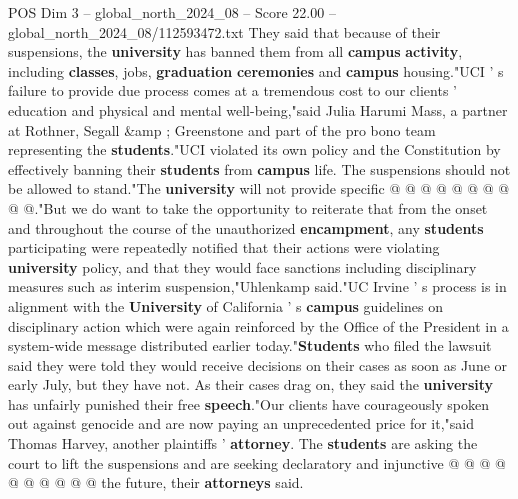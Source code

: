 \begin{textsample}{POS Dim 3 – global\_north\_2024\_08 – Score 22.00 – global\_north\_2024\_08/112593472.txt}
They said that because of their suspensions, the \textbf{university} has banned them from all \textbf{campus} \textbf{activity}, including \textbf{classes}, jobs, \textbf{graduation} \textbf{ceremonies} and \textbf{campus} housing."UCI ' s failure to provide due process comes at a tremendous cost to our clients ' education and physical and mental well-being,"said Julia Harumi Mass, a partner at Rothner, Segall \&amp ; Greenstone and part of the pro bono team representing the \textbf{students}."UCI violated its own policy and the Constitution by effectively banning their \textbf{students} from \textbf{campus} life.
The suspensions should not be allowed to stand."The \textbf{university} will not provide specific @ @ @ @ @ @ @ @ @ @."But we do want to take the opportunity to reiterate that from the onset and throughout the course of the unauthorized \textbf{encampment}, any \textbf{students} participating were repeatedly notified that their actions were violating \textbf{university} policy, and that they would face sanctions including disciplinary measures such as interim suspension,"Uhlenkamp said."UC Irvine ' s process is in alignment with the \textbf{University} of California ' s \textbf{campus} guidelines on disciplinary action which were again reinforced by the Office of the President in a system-wide message distributed earlier today."\textbf{Students} who filed the lawsuit said they were told they would receive decisions on their cases as soon as June or early July, but they have not.
As their cases drag on, they said the \textbf{university} has unfairly punished their free \textbf{speech}."Our clients have courageously spoken out against genocide and are now paying an unprecedented price for it,"said Thomas Harvey, another plaintiffs ' \textbf{attorney}.
The \textbf{students} are asking the court to lift the suspensions and are seeking declaratory and injunctive @ @ @ @ @ @ @ @ @ @ the future, their \textbf{attorneys} said.

\end{textsample}
